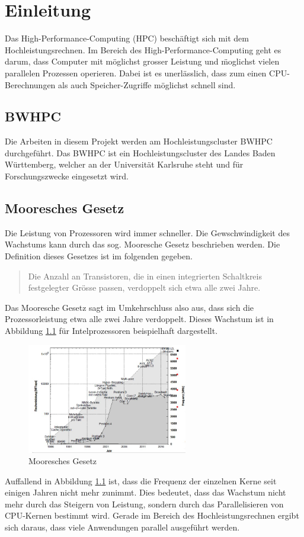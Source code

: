 \chapter{Einleitung}
\label{sec:einl}
Das High-Performance-Computing (HPC) besch\"aftigt sich mit dem Hochleistungsrechnen. Im Bereich des High-Performance-Computing geht es darum, dass Computer mit m\"oglichst grosser Leistung und \"moglichst vielen parallelen Prozessen operieren. Dabei ist es unerl\"asslich, dass zum einen CPU-Berechnungen als auch Speicher-Zugriffe m\"oglichst schnell sind.
\section{BWHPC}
Die Arbeiten in diesem Projekt werden am Hochleistungscluster BWHPC durchgef\"uhrt. Das BWHPC ist ein Hochleistungscluster des Landes Baden W\"urttemberg, welcher an der Universit\"at Karlsruhe steht und f\"ur Forschungszwecke eingesetzt wird.
\section{Mooresches Gesetz}
Die Leistung von Prozessoren wird immer schneller. Die Gewschwindigkeit des Wachstums kann durch das sog. Mooresche Gesetz beschrieben werden. Die Definition dieses Gesetzes ist im folgenden gegeben.

\begin{quote}Die Anzahl an Transistoren, die in einen integrierten Schaltkreis festgelegter Gr\"osse passen, verdoppelt sich etwa alle zwei Jahre.~\cite{Schanze.25.02.2016}\end{quote}
Das Mooresche Gesetz sagt im Umkehrschluss also aus, dass sich die Prozessorleistung etwa alle zwei Jahre verdoppelt. Dieses Wachstum ist in Abbildung \ref{fig:moore} f\"ur Intelprozessoren beispielhaft dargestellt.

\begin{figure}[h]
	\centering
	\includegraphics[width=7cm]{fig/Moore.jpg}
	\caption{Mooresches Gesetz}
	\label{fig:moore}
\end{figure}
Auffallend in Abbildung \ref{fig:moore} ist, dass die Frequenz der einzelnen Kerne seit einigen Jahren nicht mehr zunimmt. Dies bedeutet, dass das Wachstum nicht mehr durch das Steigern von Leistung, sondern durch das Parallelisieren von CPU-Kernen bestimmt wird. Gerade im Bereich des Hochleistungsrechnen ergibt sich daraus, dass viele Anwendungen parallel ausgef\"uhrt werden.
